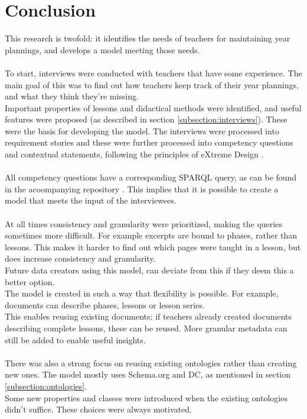 \documentclass[a4paper]{report}
\begin{document}
    \chapter{Conclusion}
    \label{section:conclusion}
    This research is twofold: it identifies the needs of teachers for maintaining year plannings, and develops a model meeting those needs.\\ \\
    To start, interviews were conducted with teachers that have some experience. The main goal of this was to find out how teachers keep track of their year plannings, and what they think they're missing.\\
    Important properties of lessons and didactical methods were identified, and useful features were proposed (as described in section \ref{subsection:interviews}). These were the basis for developing the model.
    The interviews were processed into requirement stories and these were further processed into competency questions and contextual statements, following the principles of eXtreme Design \cite{xd}.\\ \\
    All competency questions have a corresponding SPARQL query, as can be found in the acoompanying repository \cite{repo}. This implies that it is possible to create a model that meets the input of the interviewees.\\ \\
    At all times consistency and granularity were prioritized, making the queries sometimes more difficult. For example excerpts are bound to phases, rather than lessons.
    This makes it harder to find out which pages were taught in a lesson, but does increase consistency and granularity.\\
    Future data creators using this model, can deviate from this if they deem this a better option.\\
    The model is created in such a way that flexibility is possible. For example, documents can describe phases, lessons or lesson series.\\
    This enables reusing existing documents: if teachers already created documents describing complete lessons, these can be reused. More granular metadata can still be added to enable useful insights.\\ \\
    There was also a strong focus on reusing existing ontologies rather than creating new ones. The model mostly uses Schema.org and DC, as mentioned in section \ref{subsection:ontologies}.\\
    Some new properties and classes were introduced when the existing ontologies didn't suffice. These choices were always motivated.
\end{document}
